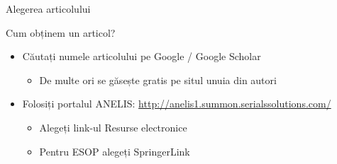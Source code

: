 \documentclass[xcolor=pdftex,romanian,colorlinks,handout]{beamer}
\begin{document}
\begin{section}{Alegerea articolului}
\begin{frame}{Cum obținem un articol?}
\begin{itemize}
    \item Căutați numele articolului pe Google / Google Scholar
     \begin{itemize}
      \item De multe ori se găsește gratis pe situl unuia din autori
     \end{itemize}
	\item Folosiți portalul ANELIS: \href{http://anelis1.summon.serialssolutions.com/}{http://anelis1.summon.serialssolutions.com/}
	\begin{itemize}
	\item Alegeți link-ul Resurse electronice
	\item Pentru ESOP alegeți SpringerLink
	\end{itemize}
\end{itemize}
\end{frame}

\end{section}
\end{document}
